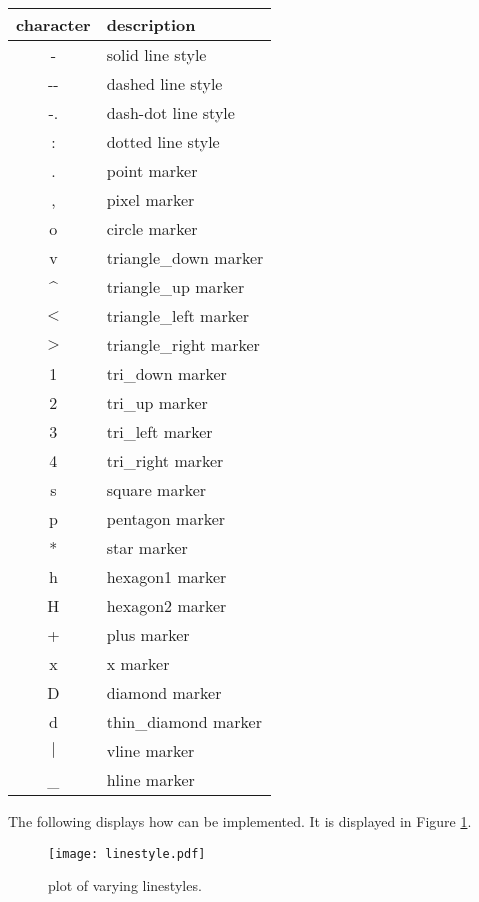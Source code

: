 \begin{table}[H] %
\centering
\begin{tabular}{c|l}
    character & description \\
    \hline
    - & solid line style \\
    -{}- & dashed line style\\
    -. & dash-dot line style \\
    : & dotted line style \\
    . & point marker \\
    , & pixel marker \\
    o & circle marker \\
    v & triangle\_down marker \\
    \^{} & triangle\_up marker \\
    $<$ & triangle\_left marker \\
    $>$ & triangle\_right marker \\
    1 & tri\_down marker \\
    2 & tri\_up marker \\
    3 & tri\_left marker \\
    4 & tri\_right marker \\
    s & square marker \\
    p & pentagon marker \\
    * & star marker \\
    h & hexagon1 marker \\
    H & hexagon2 marker \\
    + & plus marker \\
    x & x marker \\
    D & diamond marker \\
    d & thin\_diamond marker \\
    $|$ & vline marker \\
    \_{} & hline marker \\
\end{tabular}
\end{table}

The following displays how  can be implemented.
It is displayed in Figure \ref{linestyle}.



\begin{figure} %
\texttt{[image: linestyle.pdf]}
\caption{plot of varying linestyles.}
\label{linestyle}
\end{figure}


